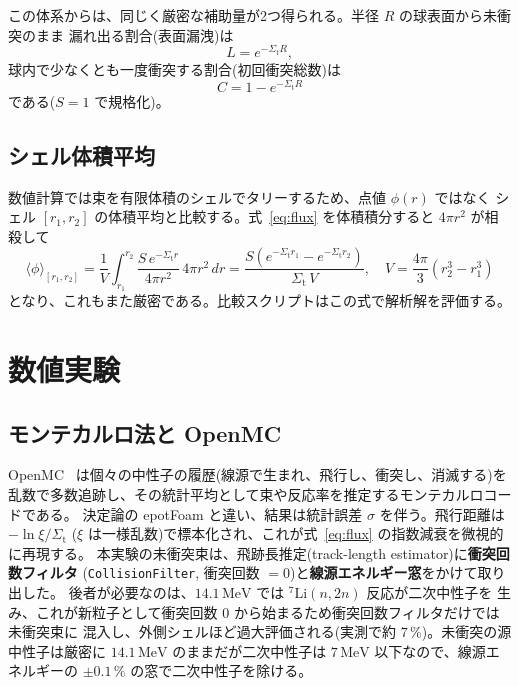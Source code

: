 \documentclass{ltjsarticle}   %
\newcommand{\Sigmat}{\Sigma_\mathrm{t}}
\begin{document}
この体系からは、同じく厳密な補助量が2つ得られる。半径 $R$ の球表面から未衝突のまま
漏れ出る割合(表面漏洩)は
\begin{equation}
  L = e^{-\Sigmat R},
  \label{eq:leak}
\end{equation}
球内で少なくとも一度衝突する割合(初回衝突総数)は
\begin{equation}
  C = 1 - e^{-\Sigmat R}
  \label{eq:coll}
\end{equation}
である($S=1$ で規格化)。

\subsection{シェル体積平均}

数値計算では束を有限体積のシェルでタリーするため、点値 $\phi(r)$ ではなく
シェル $[r_1,r_2]$ の体積平均と比較する。式~\eqref{eq:flux} を体積積分すると
$4\pi r^2$ が相殺して
\begin{equation}
  \langle\phi\rangle_{[r_1,r_2]}
  = \frac{1}{V}\!\int_{r_1}^{r_2}\!\frac{S\,e^{-\Sigmat r}}{4\pi r^2}\,4\pi r^2\,dr
  = \frac{S\left(e^{-\Sigmat r_1}-e^{-\Sigmat r_2}\right)}{\Sigmat\,V},
  \quad V=\frac{4\pi}{3}\!\left(r_2^3-r_1^3\right)
  \label{eq:shellavg}
\end{equation}
となり、これもまた厳密である。比較スクリプトはこの式で解析解を評価する。

\section{数値実験}
\label{sec:numerical}

\subsection{モンテカルロ法と OpenMC}

OpenMC~\cite{romano2015} は個々の中性子の履歴(線源で生まれ、飛行し、衝突し、消滅する)を
乱数で多数追跡し、その統計平均として束や反応率を推定するモンテカルロコードである。
決定論の epotFoam と違い、結果は統計誤差 $\sigma$ を伴う。飛行距離は $-\ln\xi/\Sigmat$
($\xi$ は一様乱数)で標本化され、これが式~\eqref{eq:flux} の指数減衰を微視的に再現する。
本実験の未衝突束は、飛跡長推定(track-length estimator)に\textbf{衝突回数フィルタ}
(\texttt{CollisionFilter}, 衝突回数 $=0$)と\textbf{線源エネルギー窓}をかけて取り出した。
後者が必要なのは、$14.1\,\mathrm{MeV}$ では ${}^{7}\mathrm{Li}(n,2n)$ 反応が二次中性子を
生み、これが新粒子として衝突回数 $0$ から始まるため衝突回数フィルタだけでは未衝突束に
混入し、外側シェルほど過大評価される(実測で約 $7\,\%$)。未衝突の源中性子は厳密に
$14.1\,\mathrm{MeV}$ のままだが二次中性子は $7\,\mathrm{MeV}$ 以下なので、線源エネルギーの
$\pm 0.1\,\%$ の窓で二次中性子を除ける。
\end{document}
